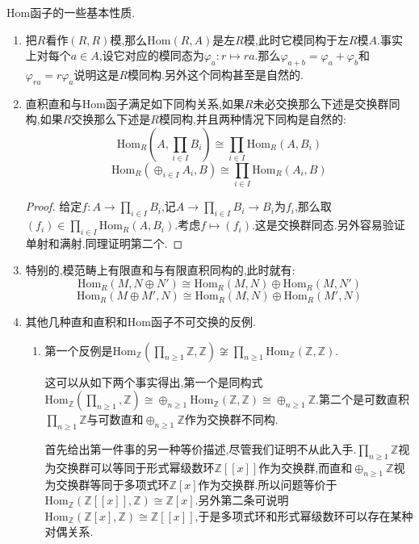 Hom函子的一些基本性质.
\begin{enumerate}
	\item 把$R$看作$(R,R)$模,那么$\mathrm{Hom}(R,A)$是左$R$模,此时它模同构于左$R$模$A$.事实上对每个$a\in A$,设它对应的模同态为$\varphi_a:r\mapsto ra$.那么$\varphi_{a+b}=\varphi_a+\varphi_b$和$\varphi_{ra}=r\varphi_a$说明这是$R$模同构.另外这个同构甚至是自然的.
	\item 直积直和与Hom函子满足如下同构关系,如果$R$未必交换那么下述是交换群同构,如果$R$交换那么下述是$R$模同构,并且两种情况下同构是自然的:
	$$\mathrm{Hom}_R(A,\prod_{i\in I}B_i)\cong\prod_{i\in I}\mathrm{Hom}_R(A,B_i)$$
	$$\mathrm{Hom}_R(\oplus_{i\in I}A_i,B)\cong\prod_{i\in I}\mathrm{Hom}_R(A_i,B)$$
	\begin{proof}
		
		给定$f:A\to\prod_{i\in I}B_i$,记$A\to\prod_{i\in I}B_i\to B_i$为$f_i$,那么取$(f_i)\in\prod_{i\in I}\mathrm{Hom}_R(A,B_i)$.考虑$f\mapsto (f_i)$.这是交换群同态.另外容易验证单射和满射.同理证明第二个.
	\end{proof}
    \item 特别的,模范畴上有限直和与有限直积同构的,此时就有:
    $$\mathrm{Hom}_R(M,N\oplus N')\cong\mathrm{Hom}_R(M,N)\oplus\mathrm{Hom}_R(M,N')$$
    $$\mathrm{Hom}_R(M\oplus M',N)\cong\mathrm{Hom}_R(M,N)\oplus\mathrm{Hom}_R(M',N)$$
    \item 其他几种直和直积和Hom函子不可交换的反例.
    \begin{enumerate}
    	\item 第一个反例是$\mathrm{Hom}_{\mathbb{Z}}(\prod_{n\ge1}\mathbb{Z},\mathbb{Z})\not\cong\prod_{n\ge1}\mathrm{Hom}_{\mathbb{Z}}(\mathbb{Z},\mathbb{Z})$.
    	
    	这可以从如下两个事实得出,第一个是同构式$\mathrm{Hom}_{\mathbb{Z}}(\prod_{n\ge1},\mathbb{Z})\cong\oplus_{n\ge1}\mathrm{Hom}_{\mathbb{Z}}(\mathbb{Z},\mathbb{Z})\cong\oplus_{n\ge1}\mathbb{Z}$.第二个是可数直积$\prod_{n\ge1}\mathbb{Z}$与可数直和$\oplus_{n\ge1}\mathbb{Z}$作为交换群不同构.
    	
    	首先给出第一件事的另一种等价描述,尽管我们证明不从此入手.$\prod_{n\ge1}\mathbb{Z}$视为交换群可以等同于形式幂级数环$\mathbb{Z}[[x]]$作为交换群,而直和$\oplus_{n\ge1}\mathbb{Z}$视为交换群等同于多项式环$\mathbb{Z}[x]$作为交换群.所以问题等价于$\mathrm{Hom}_{\mathbb{Z}}(\mathbb{Z}[[x]],\mathbb{Z})\cong\mathbb{Z}[x]$.另外第二条可说明$\mathrm{Hom}_{\mathbb{Z}}(\mathbb{Z}[x],\mathbb{Z})\cong\mathbb{Z}[[x]]$,于是多项式环和形式幂级数环可以存在某种对偶关系.
    	

\end{enumerate}
\end{enumerate}
